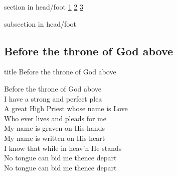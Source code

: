 \documentclass{beamer}
\begin{document}
{
{ 
 {
 \begin{beamercolorbox}[ht=4.5ex,dp=1.5ex,%
      leftskip=.3cm,rightskip=.3cm plus1fil]{section in head/foot}
 \fontsize{12}{25}\selectfont 
\hyperlink{Before the throne of God above[]1}{1}
\hyperlink{Before the throne of God above[]2}{2}
\hyperlink{Before the throne of God above[]3}{3}
 
 \end{beamercolorbox}%
  \begin{beamercolorbox}[ht=2.5ex,dp=1.125ex,%
   leftskip=.3cm,rightskip=.3cm plus1fil]{subsection in head/foot}
   \insertauthor
 \end{beamercolorbox}%
 }
}
\subsection{ Before the throne of God above }

\hypertarget{Before the throne of God above[]}{}
\begin{frame}{}
 \vfill
  \centering
  \begin{beamercolorbox}[sep=8pt,center,shadow=true,rounded=true]{title}
    Before the throne of God above     
  \end{beamercolorbox}
  \vfill
\end{frame}

\hypertarget{Before the throne of God above[]1}{}
\begin{frame}{}
\fontsize{ 15 }{ 19 }\selectfont

Before the throne of God above\\ 
I have a strong and perfect plea\\ 
A great High Priest whose name is Love\\ 
Who ever lives and pleads for me\\ 
My name is graven on His hands\\ 
My name is written on His heart\\ 
I know that while in heav'n He stands\\ 
No tongue can bid me thence depart\\ 
No tongue can bid me thence depart 

\end{frame}

\hypertarget{Before the throne of God above[]2}{}
\begin{frame}{}
\fontsize{ 15 }{ 19 }\selectfont


\end{frame}}
\end{document}
